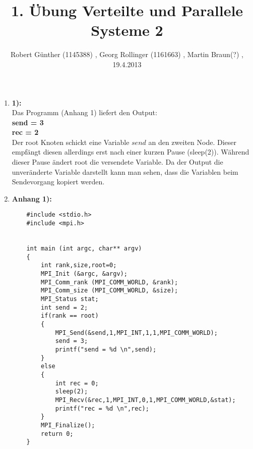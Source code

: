 \documentclass[10pt,a4paper]{article} [2003/01/01]
\title{1. Übung Verteilte und Parallele Systeme 2}
\author{ Robert Günther (1145388) , Georg Rollinger (1161663) , Martin Braun(?) , 19.4.2013}
\date{}
\begin{document}
\maketitle
\begin{enumerate}

\item[]{\textbf{1):} \\
   Das Programm (Anhang 1) liefert den Output:\\
   \textbf{
   send = 3\\
	rec = 2}\\
	Der root Knoten schickt eine Variable $send$ an den zweiten Node. Dieser empfängt diesen allerdings erst nach einer kurzen Pause (sleep(2)). Während dieser Pause ändert root die versendete Variable. Da der Output die unveränderte Variable darstellt kann man sehen, dass die Variablen beim Sendevorgang kopiert werden.


}
\newpage
\item[]{\textbf{Anhang 1):}
	\begin{lstlisting}
	#include <stdio.h>
	#include <mpi.h>


	int main (int argc, char** argv)
	{
		int rank,size,root=0;
		MPI_Init (&argc, &argv);	
  		MPI_Comm_rank (MPI_COMM_WORLD, &rank);	
  		MPI_Comm_size (MPI_COMM_WORLD, &size);	
		MPI_Status stat;
		int send = 2;
  		if(rank == root)
  		{
  			MPI_Send(&send,1,MPI_INT,1,1,MPI_COMM_WORLD);
  			send = 3;
  			printf("send = %d \n",send);
  		}
  		else
  		{
	  		int rec = 0;
  			sleep(2);
  			MPI_Recv(&rec,1,MPI_INT,0,1,MPI_COMM_WORLD,&stat);
  			printf("rec = %d \n",rec);
  		}
  		MPI_Finalize();
		return 0;
	}
	\end{lstlisting}
}

\end{enumerate}
\end{document}
